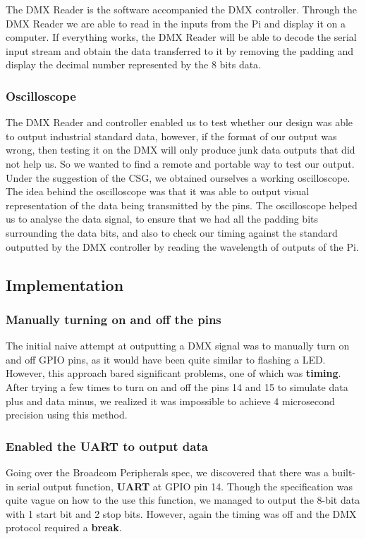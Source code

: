 \documentclass[11pt,a4paper]{article}
\begin{document}
The DMX Reader is the software accompanied the DMX controller. Through the DMX Reader we are able to read in the inputs from the Pi and display it on a computer. If everything works, the DMX Reader will be able to decode the serial input stream and obtain the data transferred to it by removing the padding and display the decimal number represented by the 8 bits data. 
\subsubsection{Oscilloscope}
The DMX Reader and controller enabled us to test whether our design was able to output industrial standard data, however, if the format of our output was wrong, then testing it on the DMX will only produce junk data outputs that did not help us. So we wanted to find a remote and portable way to test our output. Under the suggestion of the CSG, we obtained ourselves a working oscilloscope. The idea behind the oscilloscope was that it was able to output visual representation of the data being transmitted by the pins. The oscilloscope helped us to analyse the data signal, to ensure that we had all the padding bits surrounding the data bits, and also to check our timing against the standard outputted by the DMX controller by reading the wavelength of outputs of the Pi.


\subsection{Implementation}

\subsubsection{Manually turning on and off the pins}
The initial naive attempt at outputting a DMX signal was to manually turn on and off GPIO pins, as it would have been quite similar to flashing a LED. However, this approach bared significant problems, one of which was \textbf{timing}. After trying a few times to turn on and off the pins 14 and 15 to simulate data plus and data minus, we realized it was impossible to achieve 4 microsecond precision using this method.

\subsubsection{Enabled the UART to output data}
Going over the Broadcom Peripherals spec, we discovered that there was a built-in serial output function, \textbf{UART} at GPIO pin 14. Though the specification was quite vague on how to the use this function, we managed to output the 8-bit data with 1 start bit and 2 stop bits. However, again the timing was off and the DMX protocol required a \textbf{break}.
\end{document}
